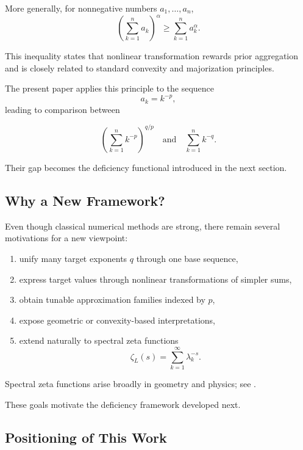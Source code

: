 \documentclass[11pt]{article}
\numberwithin{equation}{section}
\theoremstyle{definition}
\begin{document}
More generally, for nonnegative numbers \(a_1,\dots,a_n\),
\[
\left(\sum_{k=1}^{n}a_k\right)^\alpha
\ge
\sum_{k=1}^{n}a_k^\alpha.
\]

This inequality states that nonlinear transformation rewards prior aggregation and is closely related to standard convexity and majorization principles.

The present paper applies this principle to the sequence
\[
a_k=k^{-p},
\]
leading to comparison between

\[
\left(\sum_{k=1}^{n}k^{-p}\right)^{q/p}
\quad\text{and}\quad
\sum_{k=1}^{n}k^{-q}.
\]

Their gap becomes the deficiency functional introduced in the next section.

\subsection{Why a New Framework?}

Even though classical numerical methods are strong, there remain several motivations for a new viewpoint:

\begin{enumerate}[label=(\roman*), leftmargin=20pt]
\item unify many target exponents \(q\) through one base sequence,

\item express target values through nonlinear transformations of simpler sums,

\item obtain tunable approximation families indexed by \(p\),

\item expose geometric or convexity-based interpretations,

\item extend naturally to spectral zeta functions
\[
\zeta_L(s)=\sum_{k=1}^{\infty}\lambda_k^{-s}.
\]
\end{enumerate}

Spectral zeta functions arise broadly in geometry and physics; see \cite{elizalde1994zeta}.

These goals motivate the deficiency framework developed next.

\subsection{Positioning of This Work}
\end{document}
